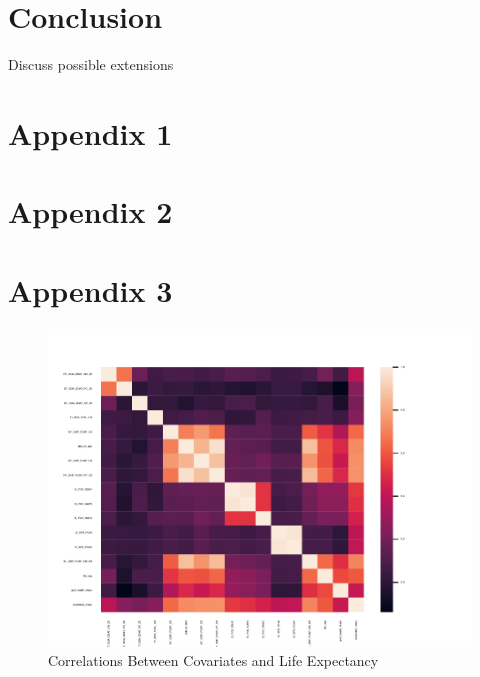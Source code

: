 \documentclass[12pt]{article}
\begin{document}
        

    \section*{Conclusion}
        
        Discuss possible extensions

    \clearpage \newpage

    \appendix

    \section*{Appendix 1}

        
        
        
    \section*{Appendix 2}


        
        
        


    \section*{Appendix 3}

        \begin{figure}[h!]
            \centering
            \caption{Correlations Between Covariates and Life Expectancy}
            \label{LE_Health_Econ_Correlations}	
            \includegraphics[width=\linewidth,keepaspectratio=true]{../Output/Figures/LE_Health_Econ_Correlations_combined.pdf}
        \end{figure}
\end{document}
